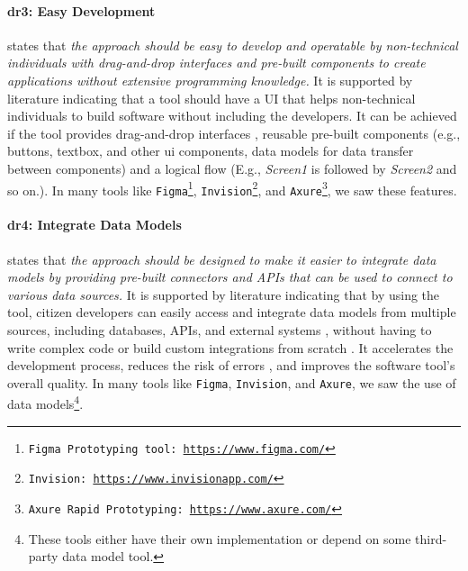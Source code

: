 \paragraph{\ac{dr}3: Easy Development} states that \textit{the approach should be easy to develop and operatable by non-technical individuals with drag-and-drop interfaces and pre-built components to create applications without extensive programming knowledge.} 
It is supported by literature indicating that a tool should have a UI that helps non-technical individuals to build software without including the developers. 
It can be achieved if the tool provides drag-and-drop interfaces \cite{article:nocode:miller}, reusable pre-built components \cite{article:prototyping:lowcode} (e.g., buttons, textbox, and other \ac{ui} components, data models for data transfer between components) and a logical flow (E.g., \textit{Screen1} is followed by \textit{Screen2} and so on.). 
In many tools like \texttt{Figma\footnote{Figma Prototyping tool: \url{https://www.figma.com/}}}, \texttt{Invision\footnote{Invision: \url{https://www.invisionapp.com/}}}, and \texttt{Axure\footnote{Axure Rapid Prototyping: \url{https://www.axure.com/}}}, we saw these features.

\paragraph{\ac{dr}4: Integrate Data Models} states that \textit{the approach should be designed to make it easier to integrate data models by providing pre-built connectors and APIs that can be used to connect to various data sources.} 
It is supported by literature indicating that by using the tool, citizen developers can easily access and integrate data models from multiple sources, including databases, APIs, and external systems \cite{paper:lowcode:khorram}, without having to write complex code or build custom integrations from scratch \cite{article:lowcode:modeldriven}.
It accelerates the development process, reduces the risk of errors \cite{misc:lowcode:platforms}, and improves the software tool's overall quality.
In many tools like \texttt{Figma}, \texttt{Invision}, and \texttt{Axure}, we saw the use of data models\footnote{These tools either have their own implementation or depend on some third-party data model tool.}.


